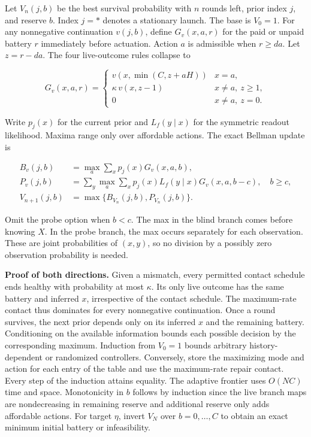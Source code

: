 \documentclass[
  11pt,
]{article}
\begin{document}
Let \(V_n(j,b)\) be the best survival probability with \(n\) rounds
left, prior index \(j\), and reserve \(b\). Index \(j=\ast\) denotes a
stationary launch. The base is \(V_0=1\). For any nonnegative
continuation \(v(j,b)\), define \(G_v(x,a,r)\) for the paid or unpaid
battery \(r\) immediately before actuation. Action \(a\) is admissible
when \(r\ge da\). Let \(z=r-da\). The four live-outcome rules collapse
to

\[
G_v(x,a,r)=
\begin{cases}
v(x,\min(C,z+aH)) & x=a,\\
\kappa\,v(x,z-1) & x\ne a,\ z\ge1,\\
0 & x\ne a,\ z=0.
\end{cases}
\]

Write \(p_j(x)\) for the current prior and \(L_f(y\mid x)\) for the
symmetric readout likelihood. Maxima range only over affordable actions.
The exact Bellman update is

\[
\begin{aligned}
B_v(j,b)&=\max_a\sum_x p_j(x)G_v(x,a,b),\\
P_v(j,b)&=\sum_y\max_a\sum_x p_j(x)L_f(y\mid x)G_v(x,a,b-c),\quad b\ge c,\\
V_{n+1}(j,b)&=\max\{B_{V_n}(j,b),P_{V_n}(j,b)\}.
\end{aligned}
\]

Omit the probe option when \(b<c\). The max in the blind branch comes
before knowing \(X\). In the probe branch, the max occurs separately for
each observation. These are joint probabilities of \((x,y)\), so no
division by a possibly zero observation probability is needed.

\textbf{Proof of both directions.} Given a mismatch, every permitted
contact schedule ends healthy with probability at most \(\kappa\). Its
only live outcome has the same battery and inferred \(x\), irrespective
of the contact schedule. The maximum-rate contact thus dominates for
every nonnegative continuation. Once a round survives, the next prior
depends only on its inferred \(x\) and the remaining battery.
Conditioning on the available information bounds each possible decision
by the corresponding maximum. Induction from \(V_0=1\) bounds arbitrary
history-dependent or randomized controllers. Conversely, store the
maximizing mode and action for each entry of the table and use the
maximum-rate repair contact. Every step of the induction attains
equality. The adaptive frontier uses \(O(NC)\) time and space.
Monotonicity in \(b\) follows by induction since the live branch maps
are nondecreasing in remaining reserve and additional reserve only adds
affordable actions. For target \(\eta\), invert \(V_N\) over
\(b=0,\ldots,C\) to obtain an exact minimum initial battery or
infeasibility.
\end{document}
